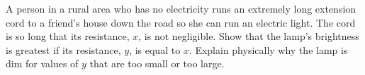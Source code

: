 A person in a rural area who has no electricity runs
        an extremely long extension cord to a friend's house down
        the road so she can run an electric light. The cord is so
        long that its resistance, $x$, is not negligible. Show that
        the lamp's brightness is greatest if its resistance, $y$, is
        equal to $x$. Explain physically why the lamp is dim for
        values of $y$ that are too small or too large.
